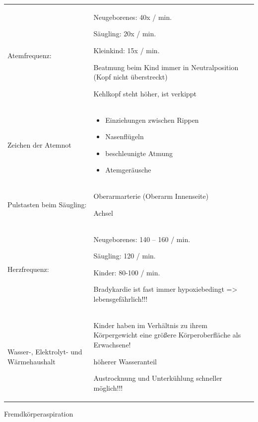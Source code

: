 \documentclass{article}
\begin{document}
\begin{center}
\tablehead{}\begin{supertabular}{|m{5.235cm}|m{8.066cm}|}
\hline
 &
\\\hline
Atemfrequenz:

 &
Neugeborenes: 40x / min.

S\"augling: 20x / min.

Kleinkind: 15x / min.

Beatmung beim Kind immer in  Neutralposition (Kopf nicht \"uberstreckt)

Kehlkopf steht h\"oher, ist verkippt

\\\hline
Zeichen der Atemnot

 &
\begin{itemize}
\item Einziehungen zwischen Rippen

\item {}Nasenfl\"ugeln

\item beschleunigte Atmung

\item Atemger\"ausche

\end{itemize}
\\\hline
Pulstasten beim S\"augling:

 &
Oberarmarterie (Oberarm Innenseite)

Achsel

\\\hline
Herzfrequenz:

 &
Neugeborenes: 140 -- 160 / min.

S\"augling: 120 / min.

Kinder: 80-100 / min.

Bradykardie  ist fast immer  hypoxiebedingt ={\textgreater}
lebensgef\"ahrlich!!!

\\\hline
Wasser-, Elektrolyt- und W\"armehaushalt

 &
Kinder haben im Verh\"altnis zu ihrem  K\"orpergewicht eine
gr\"o{\ss}ere K\"orperoberfl\"ache  als Erwachsene!

h\"oherer Wasseranteil

Austrocknung und Unterk\"uhlung schneller  m\"oglich!!!

\\\hline
\end{supertabular}
\end{center}
Fremdk\"orperaspiration 
\end{document}
